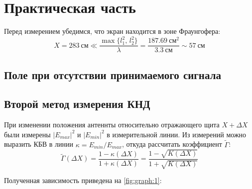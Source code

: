\section{Практическая часть}

Перед измерением убедимся, что экран находится в зоне Фраунгофера:
\[
X = 283~\text{см} \ll \frac{\max \{l_1^2,\, l_2^2\}}{\lambda} = \frac{187.69~\text{см}^2}{3.3~\text{см}} \sim 57~\text{см}
\]

\subsection{Поле при отсутствии принимаемого сигнала}

\subsection{Второй метод измерения КНД}

При изменении положения антеннты относительно отражающего щита $X + \Delta X$ были измерены $|E_{max}|^2$ и $|E_{min}|^2$ в измерительной линии. Из измерений можно выразить КБВ в линии $\kappa = E_{min} / E_{max}$, откуда рассчитать коэффициент $\tilde{\Gamma}$:
\[
\tilde{\Gamma}(\Delta X) = \frac{1 - \kappa(\Delta X)}{1 + \kappa(\Delta X)} = \frac{1 - \sqrt{K(\Delta X)}}{1 + \sqrt{K(\Delta X)}}
\]

Полученная зависимость приведена на \cref{fig:graph:1}:

